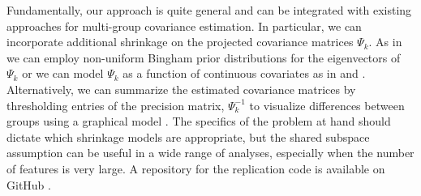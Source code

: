 \documentclass[12pt]{article}
\begin{document}
Fundamentally, our approach is quite general and can be integrated
with existing approaches for multi-group covariance
estimation.  In particular, we can incorporate additional shrinkage on
the projected covariance matrices $\Psi_k$.  As in \citet{Hoff2009} we
can employ non-uniform Bingham prior distributions for the
eigenvectors of $\Psi_k$ or we can model $\Psi_k$ as a function of continuous
covariates as in \citet{Yin2010} and \citet{Hoff2011}.  Alternatively, we can
summarize the estimated covariance matrices by thresholding entries of
the precision matrix, $\Psi_k^{-1}$ to visualize differences between
groups using a graphical model \citep{Meinshausen2006}.  The specifics
of the problem at hand should dictate which shrinkage models are
appropriate, but the shared subspace assumption can be useful in a
wide range of analyses, especially when the number of features is very
large.  A repository for the replication code is available on GitHub \citep{FranksGit}.



\end{document}
